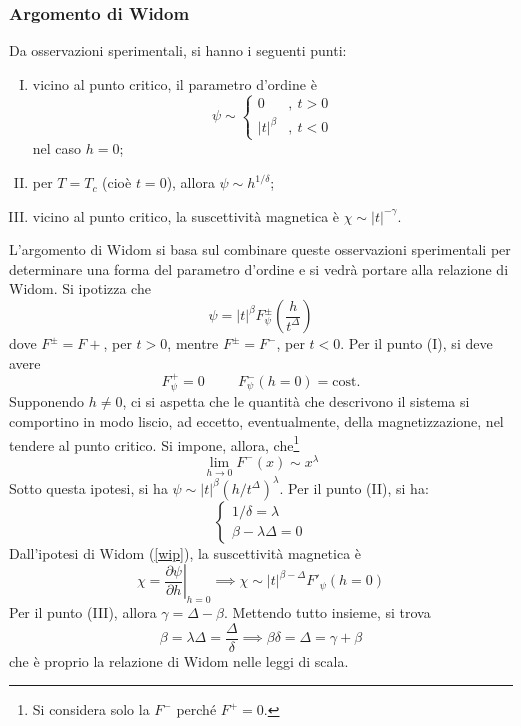 \documentclass[11pt, a4paper]{scrartcl}
\theoremstyle{style}
\theoremstyle{style1}
\newcommand*\Eval[3]{\left.#1\right\rvert_{#2}^{#3}}
\numberwithin{equation}{subsection}
\begin{document}
\subsubsection{Argomento di Widom}
Da osservazioni sperimentali, si hanno i seguenti punti:
\begin{enumerate}[(I).]
	\item vicino al punto critico, il parametro d'ordine \`e 
		\[
		\psi \sim \begin{cases}
			0 &,\ t > 0\\
			\lvert t \rvert ^{\beta } &,\ t< 0
		\end{cases}
		\] 
		nel caso $h = 0$;
	\item per $T = T_c$ (cio\`e $t = 0$), allora $\psi  \sim h^{1 / \delta }$;
	\item vicino al punto critico, la suscettivit\`a magnetica \`e $\chi \sim\lvert t \rvert ^{-\gamma}$.
\end{enumerate}
L'argomento di Widom si basa sul combinare queste osservazioni sperimentali per determinare una forma del parametro d'ordine e si vedr\`a portare alla relazione di Widom.
Si ipotizza che
\begin{equation}\label{wip}
\psi  = \lvert  t  \rvert ^{\beta } F^{\pm} _\psi  \left(\frac{h}{t^\Delta }\right) 
\end{equation}
dove $F^{\pm} = F+$, per $t>0$, mentre $F^{\pm} = F^-$, per $t< 0 $.
Per il punto (I), si deve avere 
\[
	F^+_\psi  = 0 \hspace{1cm} F^-_\psi (h=0) = \text{cost.}
\] 
Supponendo $h \neq 0$, ci si aspetta che le quantit\`a che descrivono il sistema si comportino in modo liscio, ad eccetto, eventualmente, della magnetizzazione, nel tendere al punto critico.
Si impone, allora, che\footnote{Si considera solo la $F^-$ perch\'e $F^+ = 0$.}
\[
\lim_{h \to 0} F^- (x) \sim x^\lambda 
\] 
Sotto questa ipotesi, si ha $\psi  \sim \lvert t \rvert ^{\beta } (h / t^\Delta )^\lambda $.
Per il punto (II), si ha:
\[
\begin{cases}
	1 / \delta = \lambda  \\ 
	\beta  - \lambda  \Delta = 0 
\end{cases}
\] 
Dall'ipotesi di Widom (\ref{wip}), la suscettivit\`a magnetica \`e 
\[
	\chi = \Eval{\frac{\partial \psi }{\partial h}}{h=0}{}  \implies \chi \sim \lvert t \rvert ^{\beta  - \Delta }F'_\psi (h=0)
\] 
Per il punto (III), allora $\gamma = \Delta  - \beta $.
Mettendo tutto insieme, si trova 
\[
\beta  = \lambda \Delta  = \frac{\Delta}{\delta } \implies \beta \delta = \Delta  = \gamma + \beta 
\] 
che \`e proprio la relazione di Widom nelle leggi di scala.
\end{document}
